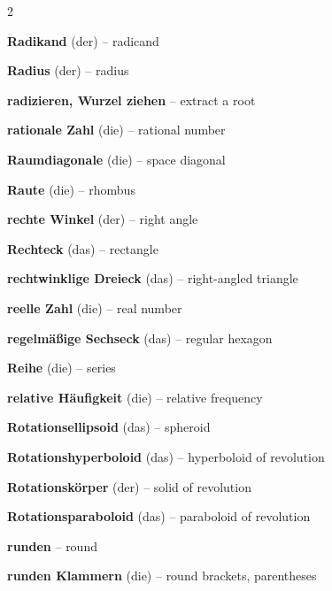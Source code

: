 \begin{multicols}{2}
\par\nopagebreak
\textbf{Radikand} (der) -- radicand\dotfill\hyperref[e:48]{\pageref*{e:48}}\par
\textbf{Radius} (der) -- radius\dotfill\hyperref[e:213]{\pageref*{e:213}}\par
\textbf{radizieren, Wurzel ziehen} -- extract a root\dotfill\hyperref[e:52]{\pageref*{e:52}}\par
\textbf{rationale Zahl} (die) -- rational number\dotfill\hyperref[e:7]{\pageref*{e:7}}\par
\textbf{Raumdiagonale} (die) -- space diagonal\dotfill\hyperref[e:252]{\pageref*{e:252}}\par
\textbf{Raute} (die) -- rhombus\dotfill\hyperref[e:201]{\pageref*{e:201}}\par
\textbf{rechte Winkel} (der) -- right angle\dotfill\hyperref[e:158]{\pageref*{e:158}}\par
\textbf{Rechteck} (das) -- rectangle\dotfill\hyperref[e:199]{\pageref*{e:199}}\par
\textbf{rechtwinklige Dreieck} (das) -- right-angled triangle\dotfill\hyperref[e:181]{\pageref*{e:181}}\par
\textbf{reelle Zahl} (die) -- real number\dotfill\hyperref[e:8]{\pageref*{e:8}}\par
\textbf{regelmäßige Sechseck} (das) -- regular hexagon\dotfill\hyperref[e:205]{\pageref*{e:205}}\par
\textbf{Reihe} (die) -- series\dotfill\hyperref[e:265]{\pageref*{e:265}}\par
\textbf{relative Häufigkeit} (die) -- relative frequency\dotfill\hyperref[e:331]{\pageref*{e:331}}\par
\textbf{Rotationsellipsoid} (das) -- spheroid\dotfill\hyperref[e:242]{\pageref*{e:242}}\par
\textbf{Rotationshyperboloid} (das) -- hyperboloid of revolution\dotfill\hyperref[e:244]{\pageref*{e:244}}\par
\textbf{Rotationskörper} (der) -- solid of revolution\dotfill\hyperref[e:239]{\pageref*{e:239}}\par
\textbf{Rotationsparaboloid} (das) -- paraboloid of revolution\dotfill\hyperref[e:243]{\pageref*{e:243}}\par
\textbf{runden} -- round\dotfill\hyperref[e:59]{\pageref*{e:59}}\par
\textbf{runden Klammern} (die) -- round brackets, parentheses\dotfill\hyperref[e:88]{\pageref*{e:88}}\par


\end{multicols}
